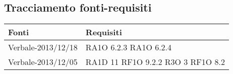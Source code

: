 \subsection{Tracciamento fonti-requisiti}
      \begin{center}
      \bgroup
      \def\arraystretch{1.8}
      \begin{longtable}{ | p{5cm} | p{5cm} |}
    
      \cellcolor[gray]{0.9} \textbf{Fonti} & \cellcolor[gray]{0.9} \textbf{Requisiti} \\ \hline       
            Verbale-2013/12/18 &  RA1O 6.2.3 \newline  RA1O 6.2.4 \newline  \\ \hline      
            Verbale-2013/12/05 &  RA1D 11 \newline  RF1O 9.2.2  \newline  R3O 3 \newline  RF1O 8.2  \newline  \\ \hline      

\end{longtable}
\end{center}
